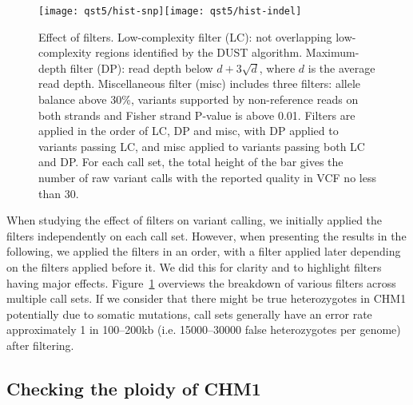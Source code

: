 \documentclass{bioinfo}
\begin{document}
\begin{figure}[!ht]
\texttt{[image: qst5/hist-snp]}\texttt{[image: qst5/hist-indel]}
\caption{Effect of filters. Low-complexity filter (LC): not overlapping
low-complexity regions identified by the DUST algorithm. Maximum-depth filter
(DP): read depth below $d+3\sqrt{d}$, where $d$ is the average read depth.
Miscellaneous filter (misc) includes three filters: allele balance above 30\%,
variants supported by non-reference reads on both strands and Fisher strand
P-value is above 0.01. Filters are applied in the order of LC, DP and misc,
with DP applied to variants passing LC, and misc applied to variants passing
both LC and DP. For each call set, the total height of the bar gives the
number of raw variant calls with the reported quality in VCF no less than 30.}\label{fig:hist}
\end{figure}

When studying the effect of filters on variant calling, we initially applied
the filters independently on each call set. However, when presenting the
results in the following, we applied the filters in an order, with a filter
applied later depending on the filters applied before it. We did this for
clarity and to highlight filters having major effects. Figure~\ref{fig:hist}
overviews the breakdown of various filters across multiple call sets.
If we consider that there might be true heterozygotes in CHM1 potentially due
to somatic mutations, call sets generally have an error rate approximately 1 in
100--200kb (i.e. 15000--30000 false heterozygotes per genome) after filtering.

\subsection{Checking the ploidy of CHM1}
\end{document}
